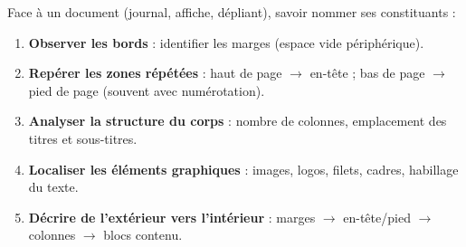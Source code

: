\documentclass[11pt]{article}
\newcommand{\cle}[1]{{\popxbold\color{popdark}#1}}
\begin{document}
\begin{methode}
Face à un document (journal, affiche, dépliant), savoir nommer ses constituants :
\begin{enumerate}
\item \textbf{Observer les bords} : identifier les \cle{marges} (espace vide périphérique).
\item \textbf{Repérer les zones répétées} : haut de page $\rightarrow$ \cle{en-tête} ; bas de page $\rightarrow$ \cle{pied de page} (souvent avec \cle{numérotation}).
\item \textbf{Analyser la structure du corps} : nombre de \cle{colonnes}, emplacement des \cle{titres} et \cle{sous-titres}.
\item \textbf{Localiser les éléments graphiques} : \cle{images}, \cle{logos}, \cle{filets}, \cle{cadres}, \cle{habillage} du texte.
\item \textbf{Décrire de l'extérieur vers l'intérieur} : marges $\rightarrow$ en-tête/pied $\rightarrow$ colonnes $\rightarrow$ blocs contenu.
\end{enumerate}
\end{methode}
\end{document}
